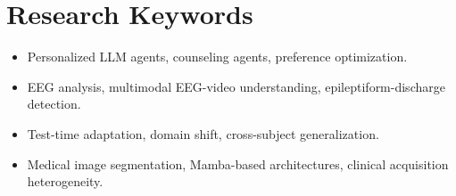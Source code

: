 \documentclass[10pt,letterpaper]{article}
\begin{document}
\section{Research Keywords}
\begin{itemize}
  \item Personalized LLM agents, counseling agents, preference optimization.
  \item EEG analysis, multimodal EEG-video understanding, epileptiform-discharge detection.
  \item Test-time adaptation, domain shift, cross-subject generalization.
  \item Medical image segmentation, Mamba-based architectures, clinical acquisition heterogeneity.
\end{itemize}
\end{document}
